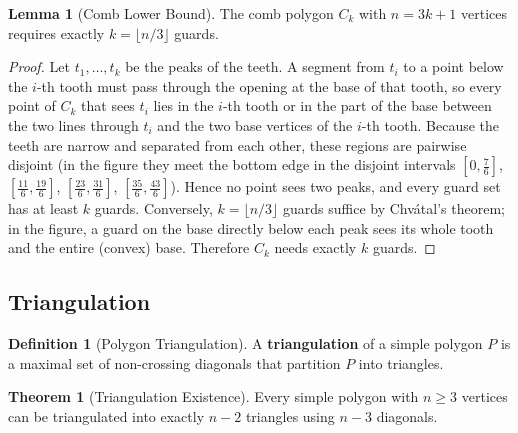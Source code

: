 \documentclass{article}
\theoremstyle{definition}
\newtheorem{theorem}{Theorem}
\newtheorem{lemma}{Lemma}
\newtheorem{definition}{Definition}
\begin{document}
\begin{lemma}[Comb Lower Bound]
The comb polygon $C_k$ with $n = 3k+1$ vertices requires exactly $k = \lfloor n/3 \rfloor$ guards.
\end{lemma}

\begin{proof}
Let $t_1, \ldots, t_k$ be the peaks of the teeth. A segment from $t_i$ to a point below the $i$-th tooth must pass through the opening at the base of that tooth, so every point of $C_k$ that sees $t_i$ lies in the $i$-th tooth or in the part of the base between the two lines through $t_i$ and the two base vertices of the $i$-th tooth. Because the teeth are narrow and separated from each other, these regions are pairwise disjoint (in the figure they meet the bottom edge in the disjoint intervals $[0, \tfrac{7}{6}]$, $[\tfrac{11}{6}, \tfrac{19}{6}]$, $[\tfrac{23}{6}, \tfrac{31}{6}]$, $[\tfrac{35}{6}, \tfrac{43}{6}]$). Hence no point sees two peaks, and every guard set has at least $k$ guards. Conversely, $k = \lfloor n/3 \rfloor$ guards suffice by Chv\'{a}tal's theorem; in the figure, a guard on the base directly below each peak sees its whole tooth and the entire (convex) base. Therefore $C_k$ needs exactly $k$ guards.
\end{proof}


\subsection{Triangulation}

\begin{definition}[Polygon Triangulation]
A \textbf{triangulation} of a simple polygon $P$ is a maximal set of non-crossing diagonals that partition $P$ into triangles.
\end{definition}

\begin{theorem}[Triangulation Existence]
Every simple polygon with $n \geq 3$ vertices can be triangulated into exactly $n-2$ triangles using $n-3$ diagonals.
\end{theorem}
\end{document}
